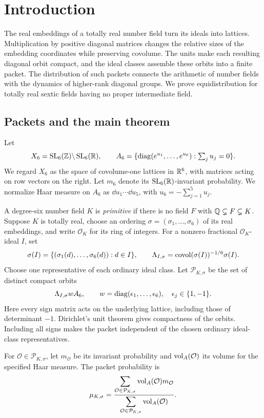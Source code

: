 \section{Introduction}\label{sec:introduction}

The real embeddings of a totally real number field turn its ideals into
lattices. Multiplication by positive diagonal matrices changes the relative
sizes of the embedding coordinates while preserving covolume. The units
make each resulting diagonal orbit compact, and the ideal classes assemble
these orbits into a finite packet. The distribution of such packets connects
the arithmetic of number fields with the dynamics of higher-rank diagonal
groups. We prove equidistribution for totally real sextic fields having no
proper intermediate field.

\subsection{Packets and the main theorem}

Let
\[
 X_6=\operatorname{SL}_6(\mathbb Z)\backslash\operatorname{SL}_6(\mathbb R),\qquad
 A_6=\{\operatorname{diag}(e^{u_1},\ldots,e^{u_6}):\textstyle\sum_j u_j=0\}.
\]
We regard $X_6$ as the space of covolume-one lattices in $\mathbb R^6$, with
matrices acting on row vectors on the right. Let $m_6$ denote its
$\operatorname{SL}_6(\mathbb R)$-invariant probability. We normalize Haar measure on $A_6$
as $\dd u_1\cdots\dd u_5$, with $u_6=-\sum_{j=1}^5u_j$.

A degree-six number field $K$ is \emph{primitive} if there is no field
$F$ with $\mathbb Q\subsetneq F\subsetneq K$. Suppose $K$ is totally real,
choose an ordering $\sigma=(\sigma_1,\ldots,\sigma_6)$ of its real
embeddings, and write $\mathcal O_K$ for its ring of integers. For a
nonzero fractional $\mathcal O_K$-ideal $I$, set
\[
 \sigma(I)=\{(\sigma_1(d),\ldots,\sigma_6(d)):d\in I\},\qquad
 \Lambda_{I,\sigma}=\operatorname{covol}(\sigma(I))^{-1/6}\sigma(I).
\]
Choose one representative of each ordinary ideal class. Let
$\mathcal P_{K,\sigma}$ be the set of distinct compact orbits
\[
 \Lambda_{I,\sigma}wA_6,
 \qquad w=\operatorname{diag}(\epsilon_1,\ldots,\epsilon_6),\quad
 \epsilon_j\in\{1,-1\}.
\]
Here every sign matrix acts on the underlying lattice, including those
of determinant $-1$. Dirichlet's unit theorem gives compactness of the
orbits. Including all signs makes the packet independent of the chosen
ordinary ideal-class representatives.

For $\mathcal O\in\mathcal P_{K,\sigma}$, let $m_{\mathcal O}$ be
its invariant probability and $\operatorname{vol}_A(\mathcal O)$ its volume for the
specified Haar measure. The packet probability is
\begin{equation}\label{eq:packet-definition}
 \mu_{K,\sigma}=
 \frac{\displaystyle\sum_{\mathcal O\in\mathcal P_{K,\sigma}}
              \operatorname{vol}_A(\mathcal O)m_{\mathcal O}}
      {\displaystyle\sum_{\mathcal O\in\mathcal P_{K,\sigma}}
              \operatorname{vol}_A(\mathcal O)}.
\end{equation}

